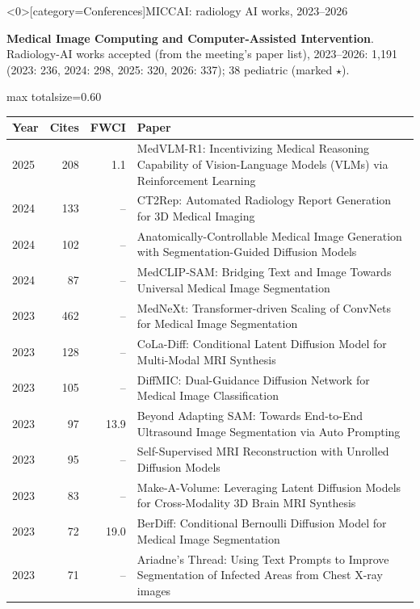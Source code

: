 \documentclass[aspectratio=169]{beamer}
\renewcommand{\arraystretch}{1.08}
\begin{document}
\begin{frame}<0>[category=Conferences]{MICCAI: radiology AI works, 2023--2026}
{\scriptsize \textbf{Medical Image Computing and Computer-Assisted Intervention}. Radiology-AI works accepted (from the meeting's paper list), 2023--2026: 1,191 (2023: 236, 2024: 298, 2025: 320, 2026: 337); 38 pediatric (marked $\star$).\par}\vspace{2pt}
\tiny
\begin{adjustbox}{max totalsize={\textwidth}{0.60\textheight}}
\renewcommand{\arraystretch}{1.2}
\begin{tabular}{|l|r|r|>{\raggedright\arraybackslash}p{}|}
\hline \textbf{Year} & \textbf{Cites} & \textbf{FWCI} & \textbf{Paper} \\ \hline
2025 & 208 & 1.1 & MedVLM-R1: Incentivizing Medical Reasoning Capability of Vision-Language Models (VLMs) via Reinforcement Learning \\ \hline
2024 & 133 & -- & CT2Rep: Automated Radiology Report Generation for 3D Medical Imaging \\ \hline
2024 & 102 & -- & Anatomically-Controllable Medical Image Generation with Segmentation-Guided Diffusion Models \\ \hline
2024 & 87 & -- & MedCLIP-SAM: Bridging Text and Image Towards Universal Medical Image Segmentation \\ \hline
2023 & 462 & -- & MedNeXt: Transformer-driven Scaling of ConvNets for Medical Image Segmentation \\ \hline
2023 & 128 & -- & CoLa-Diff: Conditional Latent Diffusion Model for Multi-Modal MRI Synthesis \\ \hline
2023 & 105 & -- & DiffMIC: Dual-Guidance Diffusion Network for Medical Image Classification \\ \hline
2023 & 97 & 13.9 & Beyond Adapting SAM: Towards End-to-End Ultrasound Image Segmentation via Auto Prompting \\ \hline
2023 & 95 & -- & Self-Supervised MRI Reconstruction with Unrolled Diffusion Models \\ \hline
2023 & 83 & -- & Make-A-Volume: Leveraging Latent Diffusion Models for Cross-Modality 3D Brain MRI Synthesis \\ \hline
2023 & 72 & 19.0 & BerDiff: Conditional Bernoulli Diffusion Model for Medical Image Segmentation \\ \hline
2023 & 71 & -- & Ariadne's Thread: Using Text Prompts to Improve Segmentation of Infected Areas from Chest X-ray images \\ \hline
\end{tabular}
\end{adjustbox}
\\[2pt]
\end{frame}
\end{document}
